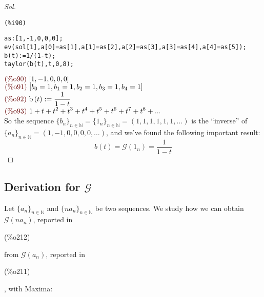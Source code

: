 \begin{proof}[Sol]
\noindent
\begin{minipage}[t]{8ex}{\color{red}\bf
\begin{verbatim}
(%i90) 
\end{verbatim}}
\end{minipage}
\begin{minipage}[t]{\textwidth}{\color{blue}
\begin{verbatim}
as:[1,-1,0,0,0];
ev(sol[1],a[0]=as[1],a[1]=as[2],a[2]=as[3],a[3]=as[4],a[4]=as[5]);
b(t):=1/(1-t);
taylor(b(t),t,0,8);
\end{verbatim}}
\end{minipage}
\begin{math}\displaystyle
\parbox{8ex}{\color{labelcolor}(\%o90) }
[1,-1,0,0,0]
\end{math}\\
\begin{math}\displaystyle
\parbox{8ex}{\color{labelcolor}(\%o91) }
[{b}_{0}=1,{b}_{1}=1,{b}_{2}=1,{b}_{3}=1,{b}_{4}=1]
\end{math}\\
\begin{math}\displaystyle
\parbox{8ex}{\color{labelcolor}(\%o92) }
\mathrm{b}\left( t\right) :=\frac{1}{1-t}
\end{math}\\
\begin{math}\displaystyle
\parbox{8ex}{\color{labelcolor}(\%o93) }
1+t+{t}^{2}+{t}^{3}+{t}^{4}+{t}^{5}+{t}^{6}+{t}^{7}+{t}^{8}+...
\end{math}\\
So the sequence $\{b_n\}_{n\in\mathbb{N} } =\{1_n\}_{n\in\mathbb{N} }
=(1,1,1,1,1,1,\ldots)$ is the ``inverse'' of $\{a_n\}_{n\in\mathbb{N}
} =(1,-1,0,0,0,0,\ldots)$, and we've found the following important
result:
\begin{equation}
  \label{eq:genfun-of-ones-sequence}
  b(t) = \mathcal{G} (1_n) =  \frac{1}{1-t}
\end{equation}
\end{proof}

\subsection{Derivation for $\mathcal{G} $}

Let $\{a_n\}_{n\in\mathbb{N} }$ and $\{n a_{n}\}_{n\in\mathbb{N} } $
be two sequences. We study how we can obtain $\mathcal{G}(n a_{n}) $,
reported in \parbox{8ex}{\color{labelcolor}(\%o212) } from
$\mathcal{G} (a_n)$, reported
in \parbox{8ex}{\color{labelcolor}(\%o211) }, with Maxima:

